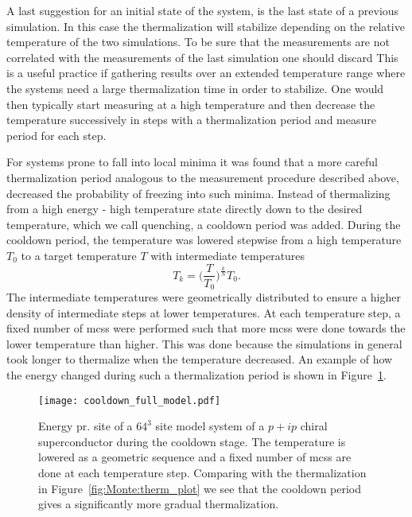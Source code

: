 A last suggestion for an initial state of the system,
is the last state of a previous simulation. In this case the thermalization will stabilize depending on the relative temperature
of the two simulations. To be sure that the measurements are not correlated with the measurements of the last simulation one should discard
This is a useful practice if gathering results over an extended temperature range where the systems need a large
thermalization time in order to stabilize. One would then typically start measuring at a high temperature and then decrease the temperature
successively in steps with a thermalization period and measure period for each step.

For systems prone to fall into local minima it was found that a more careful thermalization period analogous to the measurement procedure 
described above, decreased the probability of freezing into such minima. Instead of thermalizing from a high energy - high temperature state
directly down to the desired temperature, which we call quenching, a cooldown period was added. During the cooldown period, the temperature was
lowered stepwise from a high temperature $T_0$ to a target temperature $T$ with intermediate temperatures
\begin{equation}
    \label{eq:Monte:Therm:geometricTemperatures}
    T_k = \Big(\frac{T}{T_0}\Big)^{\frac{k}{N}}T_0.
\end{equation}
The intermediate temperatures were geometrically distributed to ensure a higher density of intermediate steps at lower temperatures. At
each temperature step, a fixed number of \ac{mcs}s were performed such that more \ac{mcs}s were done towards the lower temperature than
higher. This was done because the simulations in general took longer to thermalize when the temperature decreased. An example of how the
energy changed during such a thermalization period is shown in Figure~\ref{fig:Monte:cooldown_plot}.

\begin{figure}[t]
    \centering
    \texttt{[image: cooldown\_full\_model.pdf]}
    \caption{Energy pr. site of a $64^3$ site model system of a $p+ip$ chiral superconductor during the cooldown stage. The temperature is
    lowered as a geometric sequence and a fixed number of \ac{mcs}s are done at each temperature step. Comparing with the thermalization
    in Figure~\ref{fig:Monte:therm_plot} we see that the cooldown period gives a significantly more gradual thermalization.}
    \label{fig:Monte:cooldown_plot}
\end{figure}

